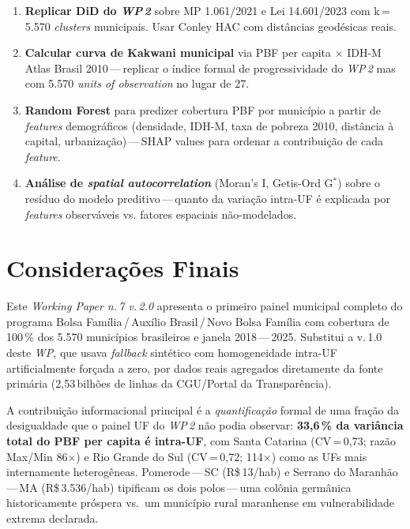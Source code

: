 \documentclass[12pt,a4paper,oneside]{article}
\newcommand{\rs}{R\$\,}
\begin{document}
\begin{enumerate}\itemsep3pt
\item \textbf{Replicar DiD do \textit{WP\,2}} sobre MP 1.061/2021 e
  Lei 14.601/2023 com k\,=\,5.570 \textit{clusters} municipais. Usar
  Conley HAC com distâncias geodésicas reais.
\item \textbf{Calcular curva de Kakwani municipal} via PBF per capita
  $\times$ IDH-M Atlas Brasil 2010\,---\,replicar o índice formal de
  progressividade do \textit{WP\,2} mas com 5.570 \textit{units of
  observation} no lugar de 27.
\item \textbf{Random Forest} para predizer cobertura PBF por município
  a partir de \textit{features} demográficos (densidade, IDH-M, taxa
  de pobreza 2010, distância à capital, urbanização)\,---\,SHAP values
  para ordenar a contribuição de cada \textit{feature}.
\item \textbf{Análise de \textit{spatial autocorrelation}} (Moran's I,
  Getis-Ord G$^*$) sobre o resíduo do modelo preditivo\,---\,quanto da
  variação intra-UF é explicada por \textit{features} observáveis vs.
  fatores espaciais não-modelados.
\end{enumerate}

\section{Considerações Finais}\label{sec:conclusao}

Este \textit{Working Paper n.\,7 v.\,2.0} apresenta o primeiro painel
municipal completo do programa Bolsa Família\,/\,Auxílio Brasil\,/\,Novo
Bolsa Família com cobertura de 100\,\% dos 5.570 municípios brasileiros e
janela 2018\,---\,2025. Substitui a v.\,1.0 deste \textit{WP}, que usava
\textit{fallback} sintético com homogeneidade intra-UF artificialmente
forçada a zero, por dados reais agregados diretamente da fonte primária
(2{,}53\,bilhões de linhas da CGU/Portal da Transparência).

A contribuição informacional principal é a \textit{quantificação} formal
de uma fração da desigualdade que o painel UF do \textit{WP\,2} não podia
observar: \textbf{33{,}6\,\% da variância total do PBF per capita é
intra-UF}, com Santa Catarina (CV\,=\,0{,}73; razão Max/Min 86$\times$)
e Rio Grande do Sul (CV\,=\,0{,}72; 114$\times$) como as UFs mais
internamente heterogêneas. Pomerode\,---\,SC (\rs 13/hab) e Serrano do
Maranhão\,---\,MA (\rs 3.536/hab) tipificam os dois polos\,---\,uma colônia
germânica historicamente próspera vs.\ um município rural maranhense em
vulnerabilidade extrema declarada.
\end{document}
